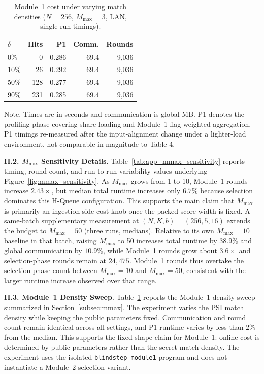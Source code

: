 \documentclass[conference,compsoc,letterpaper]{IEEEtran}
\theoremstyle{definition}
\theoremstyle{remark}
\newcommand{\myparagraph}[1]{\noindent \textbf{#1}.}
\newcommand{\Mmax}{M_{\max}}
\newcommand{\scorebits}{b}
\newcommand{\HQueue}{H-Queue}
\begin{document}
\begin{table}[!ht]
\centering
\small
\caption{Module~1 cost under varying match densities
($N=256$, $\Mmax=3$, LAN, single-run timings).}
\label{tab:app_dist_oblivious}
\begin{tabular}{@{}lrrrr@{}}
\toprule
$\delta$ & \textbf{Hits} & \textbf{P1} & \textbf{Comm.} & \textbf{Rounds} \\
\midrule
0\%  & 0   & 0.286 & 69.4 & 9{,}036 \\
10\% & 26  & 0.292 & 69.4 & 9{,}036 \\
50\% & 128 & 0.277 & 69.4 & 9{,}036 \\
90\% & 231 & 0.285 & 69.4 & 9{,}036 \\
\bottomrule
\end{tabular}

\vspace{2pt}
\footnotesize
\parbox{\linewidth}{
Note. Times are in seconds and communication is global MB.
P1 denotes the profiling phase covering share loading and Module~1 flag-weighted aggregation. P1 timings re-measured after the input-alignment change under a lighter-load environment, not comparable in magnitude to Table 4.}
\end{table}

\myparagraph{H.2. $\Mmax$ Sensitivity Details}
\label{app:mmax}
Table~\ref{tab:app_mmax_sensitivity} reports timing, round-count, and run-to-run variability values underlying Figure~\ref{fig:mmax_sensitivity}.
As $\Mmax$ grows from 1 to 10, Module~1 rounds increase \(2.43\times\), but median total runtime increases only \(6.7\%\) because selection dominates this \HQueue{} configuration.
This supports the main claim that $\Mmax$ is primarily an ingestion-side cost knob once the packed score width is fixed.
A same-batch supplementary measurement at \((N,K,\scorebits)=(256,5,16)\) extends the budget to \(\Mmax=50\) (three runs, medians).
Relative to its own \(\Mmax=10\) baseline in that batch, raising \(\Mmax\) to 50 increases total runtime by \(38.9\%\) and global communication by \(10.9\%\), while Module~1 rounds grow about $3.6\times$ and selection-phase rounds remain at \(24{,}475\).
Module~1 rounds thus overtake the selection-phase count between \(\Mmax=10\) and \(\Mmax=50\), consistent with the larger runtime increase observed over that range.

\myparagraph{H.3. Module~1 Density Sweep}
\label{app:density_sweep}
Table~\ref{tab:app_dist_oblivious} reports the Module~1 density sweep summarized in Section~\ref{subsec:mmax}.
The experiment varies the PSI match density while keeping the public parameters fixed.
Communication and round count remain identical across all settings, and P1 runtime varies by less than \(2\%\) from the median.
This supports the fixed-shape claim for Module~1: online cost is determined by public parameters rather than the secret match density.
The experiment uses the isolated \texttt{blindstep\_module1} program and does not instantiate a Module~2 selection variant.
\end{document}

